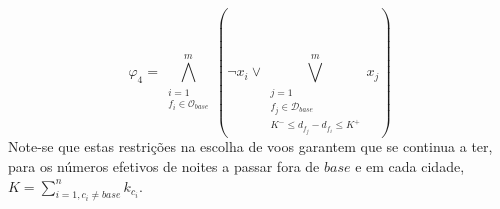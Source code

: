 \documentclass[12pt,a4paper]{article}
\begin{document}
        \begin{equation}
            \varphi_4 =
            \bigwedge_{\substack{i = 1 \\
                                 f_i \in \mathcal{O}_{base}}}
                     ^{m}
            \left(
            \neg x_i \lor
            \bigvee_{\substack{j = 1 \\
                               f_j \in \mathcal{D}_{base} \\
                               K^- \leq d_{f_j} - d_{f_i} \leq K^+}}
                ^{m}
                {x_j}
            \right)
            \label{K_nights_base_var}
        \end{equation}
        Note-se que estas restrições na escolha de voos garantem que se continua a ter, para os números efetivos de noites a passar fora de $base$ e em cada cidade, $K = \sum_{i = 1, c_i \neq base}^{n}{k_{c_i}}$.
\end{document}

